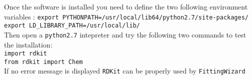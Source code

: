 \documentclass[11pt,a4paper]{article}
\begin{document}
Once the software is installed you need to define the two following 
environment variables :
\texttt{export PYTHONPATH=/usr/local/lib64/python2.7/site-packages/} \\
\texttt{export LD\_LIBRARY\_PATH=/usr/local/lib/} \\

Then open a \texttt{python2.7} intepreter and try the following two commands 
to test the installation: \\
\texttt{import rdkit}\\
\texttt{from rdkit import Chem}\\

If no error message is displayed \texttt{RDKit} can be properly used by 
\texttt{FittingWizard}
\end{document}
